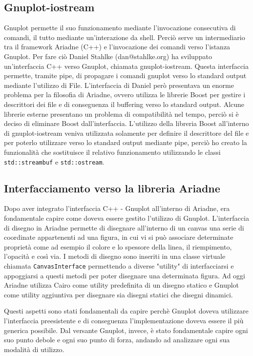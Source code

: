 \documentclass{article}
\begin{document}
\subsection{Gnuplot-iostream}
Gnuplot permette il suo funzionamento mediante l'invocazione consecutiva di comandi, il tutto mediante un'interazione da shell. Perciò serve un intermediario tra il framework Ariadne (C++) e l'invocazione dei comandi verso l'istanza Gnuplot. Per fare ciò Daniel Stahlke (dan@stahlke.org) ha sviluppato un'interfaccia C++ verso Gnuplot, chiamata gnuplot-iostream. Questa interfaccia permette, tramite pipe, di propagare i comandi gnuplot verso lo standard output mediante l'utilizzo di File. L'interfaccia di Daniel però presentava un enorme problema per la filosofia di Ariadne, ovvero utilizza le librerie Boost per gestire i descrittori dei file e di conseguenza il buffering verso lo standard output. Alcune librerie esterne presentano un problema di compatibilità nel tempo, perciò si è deciso di eliminare Boost dall'interfaccia. L'utilizzo della libreria Boost all'interno di gnuplot-iostream veniva utilizzata solamente per definire il descrittore del file e per poterlo utilizzare verso lo standard output mediante pipe, perciò ho creato la funzionalità che sostituisce il relativo funzionamento utilizzando le classi \verb|std::streambuf| e \verb|std::ostream|.

\subsection{Interfacciamento verso la libreria Ariadne}
Dopo aver integrato l'interfaccia C++ - Gnuplot all'interno di Ariadne, era fondamentale capire come doveva essere gestito l'utilizzo di Gnuplot. L'interfaccia di disegno in Ariadne permette di disegnare all'interno di un canvas una serie di coordinate appartenenti ad una figura, in cui vi si può associare determinate proprietà come ad esempio il colore e lo spessore della linea, il riempimento, l'opacità e così via. 
I metodi di disegno sono inseriti in una classe virtuale chiamata \verb|CanvasInterface| permettendo a diverse "utility" di interfacciarsi e appoggiarsi a questi metodi per poter disegnare una determinata figura. Ad oggi Ariadne utilizza Cairo come utility predefinita di un disegno statico e Gnuplot come utility aggiuntiva per disegnare sia disegni statici che disegni dinamici.

Questi aspetti sono stati fondamentali da capire perchè Gnuplot doveva utilizzare l'interfaccia preesistente e di conseguenza l'implementazione doveva essere il più generica possibile. Dal versante Gnuplot, invece, è stato fondamentale capire ogni suo punto debole e ogni suo punto di forza, andando ad analizzare ogni sua modalità di utilizzo.
\end{document}
